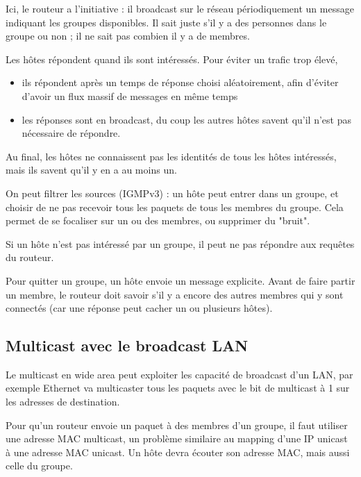 		Ici, le routeur a l'initiative : il broadcast sur le réseau périodiquement un message indiquant les groupes disponibles. Il sait juste s'il y a des personnes dans le groupe ou non ; il ne sait pas combien il y a de membres.
	
		Les hôtes répondent quand ils sont intéressés. Pour éviter un trafic trop élevé,
	
		\begin{itemize}
			\item ils répondent après un temps de réponse choisi aléatoirement, afin d'éviter d'avoir un flux massif de messages en même temps
			\item les réponses sont en broadcast, du coup les autres hôtes savent qu'il n'est pas nécessaire de répondre.
		\end{itemize}
	
		Au final, les hôtes ne connaissent pas les identités de tous les hôtes intéressés, mais ils savent qu'il y en a au moins un.
	
	
		On peut filtrer les sources (IGMPv3) : un hôte peut entrer dans un groupe, et choisir de ne pas recevoir tous les paquets de tous les membres du groupe. Cela permet de se focaliser sur un ou des membres, ou supprimer du "bruit".
	
		Si un hôte n'est pas intéressé par un groupe, il peut ne pas répondre aux requêtes du routeur.
	
		Pour quitter un groupe, un hôte envoie un message explicite. Avant de faire partir un membre, le routeur doit savoir s'il y a encore des autres membres qui y sont connectés (car une réponse peut cacher un ou plusieurs hôtes).
	
		\subsection{Multicast avec le broadcast LAN}
		
		Le multicast en wide area peut exploiter les capacité de broadcast d'un LAN, par exemple Ethernet va multicaster tous les paquets avec le bit de multicast à 1 sur les adresses de destination.
		
		Pour qu'un routeur envoie un paquet à des membres d'un groupe, il faut utiliser une adresse MAC multicast, un problème similaire au mapping d'une IP unicast à une adresse MAC unicast. Un hôte devra écouter son adresse MAC, mais aussi celle du groupe.
	

